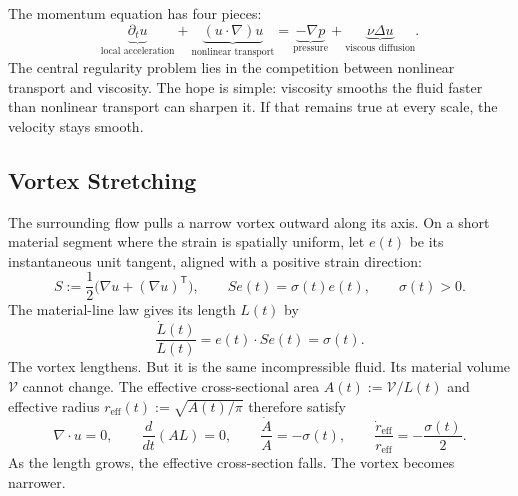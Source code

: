 
The momentum equation has four pieces:
\[
  \underbrace{\partial_t u}_{\text{local acceleration}}
  +
  \underbrace{(u\cdot\nabla)u}_{\text{nonlinear transport}}
  =
  \underbrace{-\nabla p}_{\text{pressure}}
  +
  \underbrace{\nu\Delta u}_{\text{viscous diffusion}}.
\]
The central regularity problem lies in the competition between nonlinear transport and viscosity.
The hope is simple: viscosity smooths the fluid faster than nonlinear transport can sharpen it.
If that remains true at every scale, the velocity stays smooth.

\subsection{Vortex Stretching}\label{sub:ThePerfectlyStretchingVortex}

The surrounding flow pulls a narrow vortex outward along its axis.
On a short material segment where the strain is spatially uniform, let \(e(t)\) be its instantaneous unit tangent, aligned with a positive strain direction:
\[
  S:=\frac12\bigl(\nabla u+(\nabla u)^{\mathsf T}\bigr),
  \qquad
  Se(t)=\sigma(t)e(t),
  \qquad
  \sigma(t)>0.
\]
The material-line law gives its length \(L(t)\) by
\[
  \frac{\dot L(t)}{L(t)}
  =
  e(t)\cdot Se(t)
  =
  \sigma(t).
\]
The vortex lengthens.
But it is the same incompressible fluid.
Its material volume \(\mathcal V\) cannot change.
The effective cross-sectional area \(A(t):=\mathcal V/L(t)\) and effective radius \(r_{\mathrm{eff}}(t):=\sqrt{A(t)/\pi}\) therefore satisfy
\[
  \nabla\cdot u=0,
  \qquad
  \frac{d}{dt}(A L)=0,
  \qquad
  \frac{\dot A}{A}=-\sigma(t),
  \qquad
  \frac{\dot r_{\mathrm{eff}}}{r_{\mathrm{eff}}}
  =
  -\frac{\sigma(t)}{2}.
\]
As the length grows, the effective cross-section falls.
The vortex becomes narrower.


